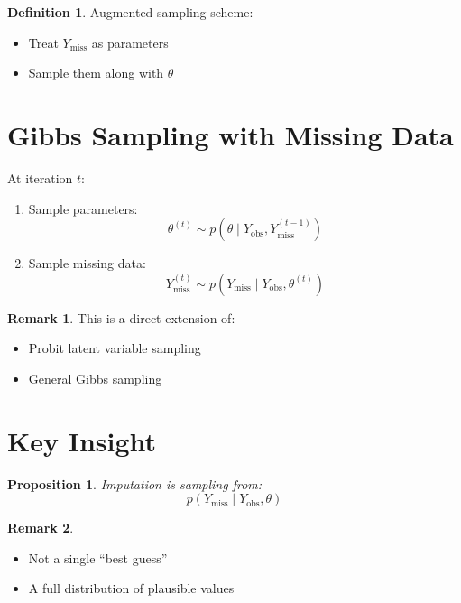 \documentclass[12pt,oneside]{book}
\numberwithin{equation}{section}
\theoremstyle{definition}
\newtheorem{definition}{Definition}[section]
\newtheorem{remark}{Remark}[section]
\theoremstyle{plain}
\newtheorem{proposition}{Proposition}[section]
\theoremstyle{remark}
\begin{document}
\begin{definition}
Augmented sampling scheme:
\begin{itemize}
\item Treat $Y_{\text{miss}}$ as parameters
\item Sample them along with $\theta$
\end{itemize}
\end{definition}

\section{Gibbs Sampling with Missing Data}

\begin{algorithm}
At iteration $t$:

\begin{enumerate}
\item Sample parameters:
$$
\theta^{(t)} \sim p(\theta \mid Y_{\text{obs}}, Y_{\text{miss}}^{(t-1)})
$$

\item Sample missing data:
$$
Y_{\text{miss}}^{(t)} \sim p(Y_{\text{miss}} \mid Y_{\text{obs}}, \theta^{(t)})
$$
\end{enumerate}
\end{algorithm}

\begin{remark}
This is a direct extension of:
\begin{itemize}
\item Probit latent variable sampling
\item General Gibbs sampling
\end{itemize}
\end{remark}

\section{Key Insight}

\begin{proposition}
Imputation is sampling from:
$$
p(Y_{\text{miss}} \mid Y_{\text{obs}}, \theta)
$$
\end{proposition}

\begin{remark}
\begin{itemize}
\item Not a single “best guess”
\item A full distribution of plausible values
\end{itemize}
\end{remark}
\end{document}
